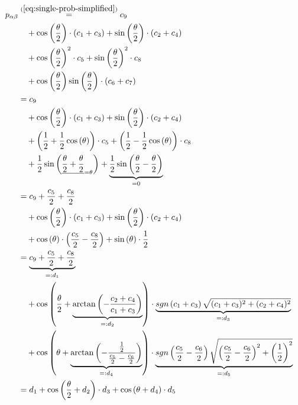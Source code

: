 \begin{equation}
    \label{eq:single-prob-simplified-simplified}
    \begin{split}
        p_{\alpha\beta}
            &\stackrel{(\ref{eq:single-prob-simplified})}= c_9 \\
                &\quad + \cos\left(\frac\theta2\right) \cdot \left(c_1 + c_3\right) + \sin\left(\frac\theta2\right) \cdot \left(c_2 + c_4\right) \\
                &\quad + \cos\left(\frac\theta2\right)^2 \cdot c_5 + \sin\left(\frac\theta2\right)^2 \cdot c_8 \\
                &\quad + \cos\left(\frac\theta2\right)\sin\left(\frac\theta2\right) \cdot \left(c_6 + c_7\right) \\
            &= c_9 \\
                &\quad + \cos\left(\frac\theta2\right) \cdot \left(c_1 + c_3\right) + \sin\left(\frac\theta2\right) \cdot \left(c_2 + c_4\right) \\
                &\quad + \left(\frac12 + \frac12 \cos\left(\theta\right)\right) \cdot c_5 + \left(\frac12 - \frac12 \cos\left(\theta\right)\right) \cdot c_8 \\
                &\quad + \frac12 \sin\left(\underline{\frac\theta2 + \frac\theta2}_{=\theta}\right) + \underbrace{\frac12 \sin\left(\frac\theta2 - \frac\theta2\right)}_{= 0} \\
            &= c_9 + \frac{c_5}{2} + \frac{c_8}{2} \\
                &\quad + \cos\left(\frac\theta2\right) \cdot \left(c_1 + c_3\right) + \sin\left(\frac\theta2\right) \cdot \left(c_2 + c_4\right) \\
                &\quad + \cos\left(\theta\right) \cdot \left(\frac{c_5}{2} - \frac{c_8}{2}\right) + \sin\left(\theta\right) \cdot \frac12 \\
            &= \underbrace{c_9 + \frac{c_5}{2} + \frac{c_8}{2}}_{=: d_1} \\
                &\quad + \cos\left(\frac\theta2 + \underbrace{\arctan\left(-\frac{c_2 + c_4}{c_1 + c_3}\right)}_{=: d_2}\right) \cdot \underbrace{sgn\left(c_1 + c_3\right) \sqrt{(c_1 + c_3)^2 + (c_2 + c_4)^2}}_{=: d_3} \\
                &\quad + \cos\left(\theta + \underbrace{\arctan\left(-\frac{\frac12}{\frac{c_5}{2} - \frac{c_6}{2}}\right)}_{=: d_4}\right) \cdot \underbrace{sgn\left(\frac{c_5}{2} - \frac{c_6}{2}\right) \sqrt{\left(\frac{c_5}{2} - \frac{c_6}{2}\right)^2 + \left(\frac12\right)^2}}_{=: d_5} \\
            &= d_1 + \cos\left(\frac\theta2 + d_2\right) \cdot d_3 + \cos\left(\theta + d_4\right) \cdot d_5
    \end{split}
\end{equation}
